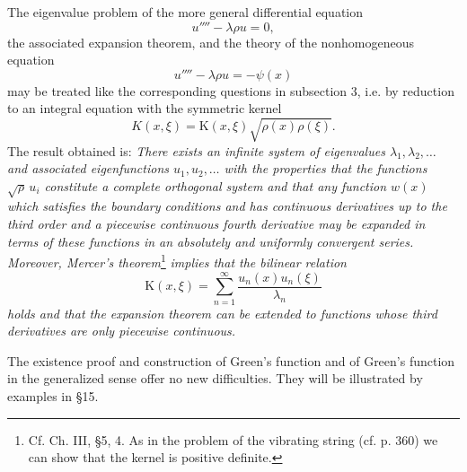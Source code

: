 The eigenvalue problem of the more general differential equation
\[
u''''-\lambda\rho u=0,
\]
the associated expansion theorem, and the theory of the nonhomogeneous equation
\[
u''''-\lambda\rho u=-\psi(x)
\]
may be treated like the corresponding questions in subsection 3, i.e. by reduction to an integral equation with the symmetric kernel
\[
K(x,\xi)=\mathrm K(x,\xi)\sqrt{\rho(x)\rho(\xi)}.
\]
The result obtained is: \emph{There exists an infinite system of eigenvalues $\lambda_1,\lambda_2,\ldots$ and associated eigenfunctions $u_1,u_2,\ldots$ with the properties that the functions $\sqrt\rho\,u_i$ constitute a complete orthogonal system and that any function $w(x)$ which satisfies the boundary conditions and has continuous derivatives up to the third order and a piecewise continuous fourth derivative may be expanded in terms of these functions in an absolutely and uniformly convergent series. Moreover, Mercer's theorem}\footnote{Cf. Ch. III, \S5, 4. As in the problem of the vibrating string (cf. p. 360) we can show that the kernel is positive definite.} \emph{implies that the bilinear relation}
\[
\mathrm K(x,\xi)=\sum_{n=1}^{\infty}\frac{u_n(x)u_n(\xi)}{\lambda_n}
\]
\emph{holds and that the expansion theorem can be extended to functions whose third derivatives are only piecewise continuous.}

The existence proof and construction of Green's function and of Green's function in the generalized sense offer no new difficulties. They will be illustrated by examples in \S15.

